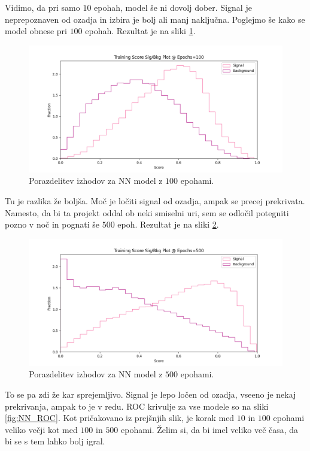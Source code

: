 \documentclass[a4paper]{article}
\begin{document}
Vidimo, da pri samo $10$ epohah, model še ni dovolj dober. Signal je neprepoznaven od ozadja in izbira je bolj ali manj
naključna. Poglejmo še kako se model obnese pri $100$ epohah. Rezultat je na sliki \ref{fig:NN_100}. \\

\begin{figure}[H]
    \centering
    \includegraphics[width=1\textwidth]{../images/NNsig_bk_100.png}
    \caption{Porazdelitev izhodov za NN model z $100$ epohami.}
    \label{fig:NN_100}
\end{figure}

Tu je razlika že boljša. Moč je ločiti signal od ozadja, ampak se precej prekrivata. Namesto, da bi ta projekt oddal
ob neki smiselni uri, sem se odločil potegniti pozno v noč in pognati še $500$ epoh. Rezultat je na sliki \ref{fig:NN_500}. \\

\begin{figure}[H]
    \centering
    \includegraphics[width=1\textwidth]{../images/NNsig_bk_500.png}
    \caption{Porazdelitev izhodov za NN model z $500$ epohami.}
    \label{fig:NN_500}
\end{figure}

To se pa zdi že kar sprejemljivo. Signal je lepo ločen od ozadja, vseeno je nekaj prekrivanja, ampak to je v redu.
ROC krivulje za vse modele so na sliki \ref{fig:NN_ROC}. Kot pričakovano iz prejšnjih slik, je korak med $10$ in $100$ 
epohami veliko večji kot med $100$ in $500$ epohami. Želim si, da bi imel veliko več časa, da bi se s tem lahko bolj igral. \\
\end{document}
